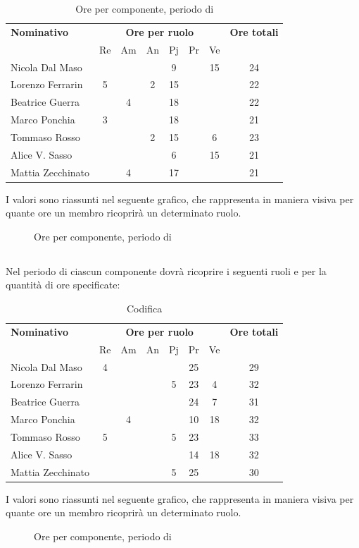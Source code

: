 \begin{table}[H]
	\centering
	\begin{tabular}{|l|c|c|c|c|c|c|c|}
		\hline
		\textbf{Nominativo} & 
		\multicolumn{6}{c|}{\textbf{Ore per ruolo}} & 
		\textbf{Ore totali} \\
		& Re & Am & An & Pj & Pr & Ve & \\
		\hline
		Nicola Dal Maso & & & &9 & &15 & 24 \\
		Lorenzo Ferrarin &5 & &2 &15 & & & 22 \\
		Beatrice Guerra & &4 & &18 & & & 22 \\
		Marco Ponchia &3 & & &18 & & & 21 \\
		Tommaso Rosso & & &2 &15 & &6 & 23 \\
		Alice V. Sasso & & & &6 & &15 & 21 \\
		Mattia Zecchinato & &4 & &17 & & & 21 \\
		\hline
	\end{tabular}
	\caption{Ore per componente, periodo di \PD{}}
\end{table}
I valori sono riassunti nel seguente grafico, che rappresenta in maniera visiva per quante ore un membro ricoprirà un determinato ruolo.
\begin{figure}[H]
	\centering
	\caption{Ore per componente, periodo di \PD{}}
\end{figure}

\subsection{\Cod}
Nel periodo di \Cod{} ciascun componente dovrà ricoprire i seguenti ruoli e per la quantità di ore specificate:

\begin{table}[H]
	\centering
	\begin{tabular}{|l|c|c|c|c|c|c|c|}
		\hline
		\textbf{Nominativo} & 
		\multicolumn{6}{c|}{\textbf{Ore per ruolo}} & 
		\textbf{Ore totali} \\
		& Re & Am & An & Pj & Pr & Ve & \\
		\hline
		Nicola Dal Maso &4 & & & &25 & & 29 \\
		Lorenzo Ferrarin & & & &5 &23 &4 & 32 \\
		Beatrice Guerra & & & & &24 &7 & 31 \\
		Marco Ponchia & &4 & & &10 &18 & 32 \\
		Tommaso Rosso &5 & & &5 &23 & & 33 \\
		Alice V. Sasso & & & & &14 &18 & 32 \\
		Mattia Zecchinato & & & &5 &25 & & 30 \\
		\hline
	\end{tabular}
	\caption{Codifica}
\end{table}
I valori sono riassunti nel seguente grafico, che rappresenta in maniera visiva per quante ore un membro ricoprirà un determinato ruolo.
\begin{figure}[H]
	\centering
	\caption{Ore per componente, periodo di \Cod{}}
\end{figure}

